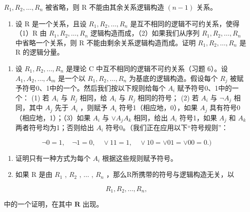 \(R_{1}, R_{2}, \ldots, R_{n}\) 被省略，则 R 不能由其余关系逻辑构造 \((n - 1)\) 关系。

\begin{enumerate}
\def\labelenumi{(\alph{enumi})}
\setcounter{enumi}{3}
\tightlist
\item
  设 R 是一个关系，且设 \(R_{1}, R_{2}, \ldots, R_{n}\) 是互不相同的逻辑不可约关系，使得（1）R 由 \(R_{1}, R_{2}, \ldots, R_{n}\) 逻辑构造而成，（2）如果我们从序列 \(R_{1}, R_{2}, \ldots, R_{n}\) 中省略一个关系，则 R 不能由剩余关系逻辑构造而成。证明 \(R_{1}, R_{2}, \ldots, R_{n}\) 是 R 的逻辑分量。
\end{enumerate}

\begin{enumerate}
\def\labelenumi{\arabic{enumi}.}
\setcounter{enumi}{6}
\tightlist
\item
  设 \(R_{1}, R_{2}, \ldots, R_{n}\) 是理论 C 中互不相同的逻辑不可约关系（习题 6）。设 \(A_{1}, A_{2}, \ldots, A_{m}\) 是一个以 \(R_{1}, R_{2}, \ldots, R_{n}\) 为基底的逻辑构造。假设每个 \(R_{j}\) 被赋予符号0、1中的一个。然后我们按以下规则给每个 \(A_{i}\) 赋予符号0、1中的一个： (1) 若 \(A_{i}\) 与 \(R_{j}\) 相同，给 \(A_{i}\) 与 \(R_{j}\) 相同的符号； (2) 若 \(A_{i}\) 与 \(\neg A_{j}\) 相同，其中 \(A_{j}\) 先于 \(A_{i}\) ，则赋予 \(A_{i}\) 符号1（相应地，0），如果 \(A_{j}\) 具有符号0（相应地，1）；（3）如果 \(A_{i}\) 与 \(\vee A_{j}A_{k}\) 相同，给出 \(A_{i}\) 符号1，如果 \(A_{j}\) 和 \(A_{k}\) 两者符号均为1；否则给出 \(A_{i}\) 符号0。（我们正在应用以下“符号规则”：
\end{enumerate}

\[
\neg 0 = 1, \quad \neg 1 = 0, \quad \vee 1 1 = 1, \quad \vee 1 0 = \vee 0 1 = \vee 0 0 = 0.)
\]

\begin{enumerate}
\def\labelenumi{(\alph{enumi})}
\item
  证明只有一种方式为每个 \(A_{i}\) 根据这些规则赋予符号。
\item
  如果 R 是由 \(R_{1}\) , \(R_{2}\) , \(\ldots\) , \(R_{n}\) ，那么R所携带的符号与逻辑构造无关，以
\end{enumerate}

\[
R _ {1}, R _ {2}, \dots , R _ {n},
\]

中的一个证明，在其中 \(\pmb{R}\) 出现。


